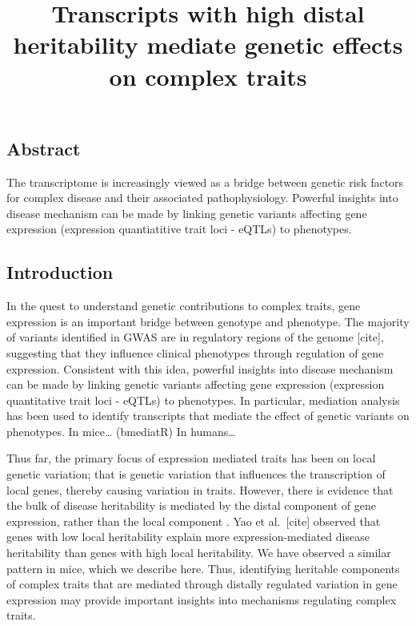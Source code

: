 \documentclass[
]{article}
\title{Transcripts with high distal heritability mediate genetic effects
on complex traits}
\author{}
\date{\vspace{-2.5em}}
\begin{document}
\maketitle

\subsection{Abstract}\label{abstract}

The transcriptome is increasingly viewed as a bridge between genetic
risk factors for complex disease and their associated pathophysiology.
Powerful insights into disease mechanism can be made by linking genetic
variants affecting gene expression (expression quantiatitive trait loci
- eQTLs) to phenotypes.

\subsection{Introduction}\label{introduction}

In the quest to understand genetic contributions to complex traits, gene
expression is an important bridge between genotype and phenotype. The
majority of variants identified in GWAS are in regulatory regions of the
genome {[}cite{]}, suggesting that they influence clinical phenotypes
through regulation of gene expression. Consistent with this idea,
powerful insights into disease mechanism can be made by linking genetic
variants affecting gene expression (expression quantitative trait loci -
eQTLs) to phenotypes. In particular, mediation analysis has been used to
identify transcripts that mediate the effect of genetic variants on
phenotypes. In mice\ldots{}
\cite{pmid29567659,pmid31465442,pmid35672473} (bmediatR)
\cite{pmid35533209} In humans\ldots{} \cite{pmid25533967,pmid24232670}

Thus far, the primary focus of expression mediated traits has been on
local genetic variation; that is genetic variation that influences the
transcription of local genes, thereby causing variation in traits.
However, there is evidence that the bulk of disease heritability is
mediated by the distal component of gene expression, rather than the
local component \cite{pmid32424349}. Yao et al.~{[}cite{]} observed that
genes with low local heritability explain more expression-mediated
disease heritability than genes with high local heritability. We have
observed a similar pattern in mice, which we describe here. Thus,
identifying heritable components of complex traits that are mediated
through distally regulated variation in gene expression may provide
important insights into mechanisms regulating complex traits.
\end{document}
